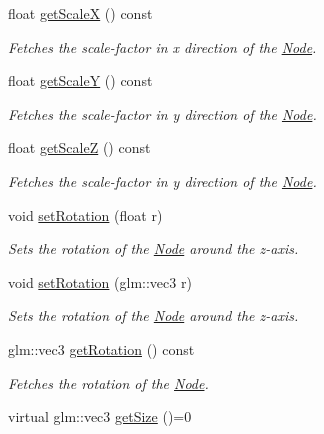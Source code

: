 \begin{DoxyCompactItemize}
float \mbox{\hyperlink{classsage_1_1Node_a27040ef8ab59ccf42b87d6ddc8d794e6}{get\+ScaleX}} () const
\begin{DoxyCompactList}\small\item\em Fetches the scale-\/factor in x direction of the \mbox{\hyperlink{classsage_1_1Node}{Node}}. \end{DoxyCompactList}\item 
float \mbox{\hyperlink{classsage_1_1Node_ab87661ab8940512baf2e7639ea55ff87}{get\+ScaleY}} () const
\begin{DoxyCompactList}\small\item\em Fetches the scale-\/factor in y direction of the \mbox{\hyperlink{classsage_1_1Node}{Node}}. \end{DoxyCompactList}\item 
float \mbox{\hyperlink{classsage_1_1Node_a0b55ddbe04d126953e1db8606d9a9ecd}{get\+ScaleZ}} () const
\begin{DoxyCompactList}\small\item\em Fetches the scale-\/factor in y direction of the \mbox{\hyperlink{classsage_1_1Node}{Node}}. \end{DoxyCompactList}\item 
void \mbox{\hyperlink{classsage_1_1Node_a422e877f5a830ad4d50b8e13250ee553}{set\+Rotation}} (float r)
\begin{DoxyCompactList}\small\item\em Sets the rotation of the \mbox{\hyperlink{classsage_1_1Node}{Node}} around the z-\/axis. \end{DoxyCompactList}\item 
void \mbox{\hyperlink{classsage_1_1Node_aec0a7e0159605b7701a8b156d78ef967}{set\+Rotation}} (glm\+::vec3 r)
\begin{DoxyCompactList}\small\item\em Sets the rotation of the \mbox{\hyperlink{classsage_1_1Node}{Node}} around the z-\/axis. \end{DoxyCompactList}\item 
glm\+::vec3 \mbox{\hyperlink{classsage_1_1Node_aff82a2e9d9add8b8c3633482da5e6d88}{get\+Rotation}} () const
\begin{DoxyCompactList}\small\item\em Fetches the rotation of the \mbox{\hyperlink{classsage_1_1Node}{Node}}. \end{DoxyCompactList}\item 
virtual glm\+::vec3 \mbox{\hyperlink{classsage_1_1Node_ad14a04d08b5261c27d3080f6a5e12836}{get\+Size}} ()=0

\end{DoxyCompactItemize}
